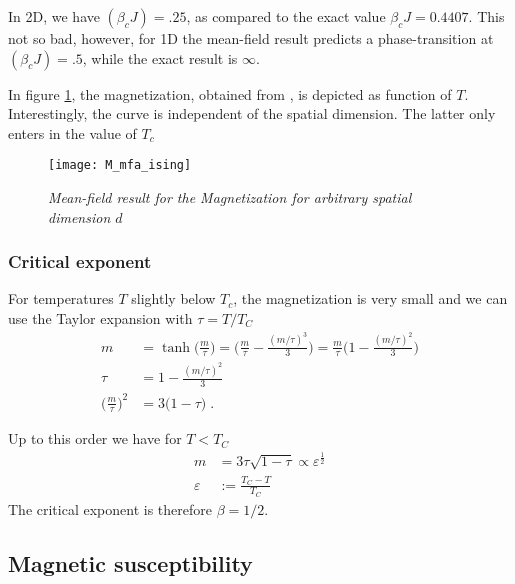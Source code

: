 In 2D, we have $(\beta_{c} J)=.25$, as compared to the exact value $\beta_{c}J=0.4407$.
This not so bad, however, for 1D the mean-field result predicts a phase-transition at $(\beta_{c} J)=.5$, while the exact result is $\infty$.

In figure \ref{fig:M:mfa:ising}, the magnetization, obtained from , is depicted as function of $T$. Interestingly, the curve is independent of the spatial dimension.
The latter only enters in the value of $T_{c}$
\begin{figure}[t]
\begin{center}
\texttt{[image: M\_mfa\_ising]}
\caption{\it Mean-field result for the Magnetization for arbitrary spatial dimension $d$\label{fig:M:mfa:ising}}
\end{center}
\end{figure}

\subsubsection{Critical exponent}
For temperatures $T$ slightly below $T_{c}$, the magnetization is very small and we can use the Taylor expansion with $\tau = T/T_{C}$
\begin{align*}
m &= \tanh\big( \frac{m}{\tau} \big)= \bigg( \frac{m}{\tau} -\frac{(m/\tau)^{3}}{3} \bigg)
= \frac{m}{\tau}\bigg( 1- \frac{(m/\tau)^{2}}{3}\bigg)\\
\tau  &= 1 - \frac{(m/\tau)^{2}}{3}\\
\bigg(\frac{m}{\tau}\bigg)^{2} &= 3 \bigg( 1-\tau\bigg)\;.
\end{align*}

Up to this order we have for $T<T_{C}$
%
\begin{align}\label{eq:ising:mfa:m:Taylor}
m&= 3\tau \sqrt{1- \tau} \propto \varepsilon^{\frac{1}{2}}\\
\varepsilon &:= \frac{T_{C}-T}{T_{C}}
\end{align}
%
The  critical exponent is therefore $\beta=1/2$. 


\subsection{Magnetic susceptibility} %

